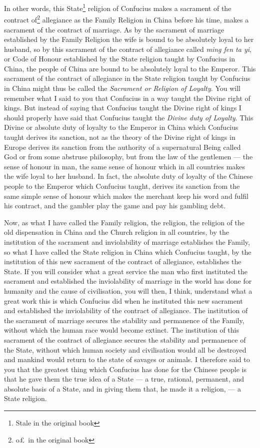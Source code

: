 In other words, this State\footnote{Stale in the original book} religion of Confucius makes a sacrament of the contract of\footnote{o\pounds\, in the original book} allegiance as the Family Religion in China before his time, makes a sacrament of the contract of marriage. 
As by the sacrament of marriage established by the Family Religion the wife is bound to be absolutely loyal to her husband, so by this sacrament of the contract of allegiance called {\em{ming fen ta yi}}, or Code of Honour established by the State religion taught by Confucius in China, the people of China are bound to be absolutely loyal to the Emperor. 
This sacrament of the contract of allegiance in the State religion taught by Confucius in China might thus be called the \emph{Sacrament or Religion of Loyalty}. 
You will remember what I said to you that Confucius in a way taught the Divine right of kings. 
But instead of saying that Confucius taught the Divine right of kings I should properly have  said that Confucius taught the \emph{Divine duty of Loyalty}.
This Divine or absolute duty of loyalty to the Emperor in China which Confucius taught derives its sanction, not as the theory of the Divine right of kings in Europe derives its sanction from the authority of a supernatural Being called God or from some abstruse philosophy, but from the law of the gentlemen --- the sense of honour in man, the same sense of honour which in all countries makes the wife loyal to her husband.
In fact, the absolute duty of loyalty of the Chinese people to the Emperor which Confucius taught, derives its sanction from the same simple sense of honour which makes the merchant keep his word and fulfil his contract, and the gambler play the game and pay his gambling debt.

Now, as what I have called the Family religion, the religion, the religion of the old dispensation in China and the Church religion in all countries, by the institution of the sacrament and inviolability of marriage establishes the Family, so what I have called the State religion in China which Confucius taught, by the institution of this new sacrament of the contract of allegiance, establishes the State. 
If you will consider what a great service the man who first instituted the sacrament and established the inviolability of marriage in the world has done for humanity and the cause of civilisation, you will then, I think, understand what a great work this is which Confucius did when he instituted this new sacrament and established the inviolability of the contract of allegiance.
The institution of the sacrament of marriage secures the stability and permanence of the Family, without which the human race would become extinct.
The institution of this sacrament of the contract of allegiance secures the stability and permanence of the State, without which human society and civilisation would all be destroyed  and mankind would return to the state of savages or animals.
I therefore said to you that the greatest thing which Confucius has done for the Chinese people is that he gave them the true idea of a State --- a true, rational, permanent, and absolute basis of a State, and in giving them that, he made it a religion, --- a State religion.

